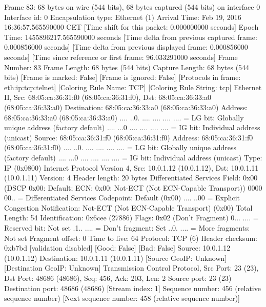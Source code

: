 Frame 83: 68 bytes on wire (544 bits), 68 bytes captured (544 bits) on interface 0
    Interface id: 0
    Encapsulation type: Ethernet (1)
    Arrival Time: Feb 19, 2016 16:36:57.565590000 CET
    [Time shift for this packet: 0.000000000 seconds]
    Epoch Time: 1455896217.565590000 seconds
    [Time delta from previous captured frame: 0.000856000 seconds]
    [Time delta from previous displayed frame: 0.000856000 seconds]
    [Time since reference or first frame: 96.033291000 seconds]
    Frame Number: 83
    Frame Length: 68 bytes (544 bits)
    Capture Length: 68 bytes (544 bits)
    [Frame is marked: False]
    [Frame is ignored: False]
    [Protocols in frame: eth:ip:tcp:telnet]
    [Coloring Rule Name: TCP]
    [Coloring Rule String: tcp]
Ethernet II, Src: 68:05:ca:36:31:f0 (68:05:ca:36:31:f0), Dst: 68:05:ca:36:33:a0 (68:05:ca:36:33:a0)
    Destination: 68:05:ca:36:33:a0 (68:05:ca:36:33:a0)
        Address: 68:05:ca:36:33:a0 (68:05:ca:36:33:a0)
        .... ..0. .... .... .... .... = LG bit: Globally unique address (factory default)
        .... ...0 .... .... .... .... = IG bit: Individual address (unicast)
    Source: 68:05:ca:36:31:f0 (68:05:ca:36:31:f0)
        Address: 68:05:ca:36:31:f0 (68:05:ca:36:31:f0)
        .... ..0. .... .... .... .... = LG bit: Globally unique address (factory default)
        .... ...0 .... .... .... .... = IG bit: Individual address (unicast)
    Type: IP (0x0800)
Internet Protocol Version 4, Src: 10.0.1.12 (10.0.1.12), Dst: 10.0.1.11 (10.0.1.11)
    Version: 4
    Header length: 20 bytes
    Differentiated Services Field: 0x00 (DSCP 0x00: Default; ECN: 0x00: Not-ECT (Not ECN-Capable Transport))
        0000 00.. = Differentiated Services Codepoint: Default (0x00)
        .... ..00 = Explicit Congestion Notification: Not-ECT (Not ECN-Capable Transport) (0x00)
    Total Length: 54
    Identification: 0x6cee (27886)
    Flags: 0x02 (Don't Fragment)
        0... .... = Reserved bit: Not set
        .1.. .... = Don't fragment: Set
        ..0. .... = More fragments: Not set
    Fragment offset: 0
    Time to live: 64
    Protocol: TCP (6)
    Header checksum: 0xb7bd [validation disabled]
        [Good: False]
        [Bad: False]
    Source: 10.0.1.12 (10.0.1.12)
    Destination: 10.0.1.11 (10.0.1.11)
    [Source GeoIP: Unknown]
    [Destination GeoIP: Unknown]
Transmission Control Protocol, Src Port: 23 (23), Dst Port: 48686 (48686), Seq: 456, Ack: 203, Len: 2
    Source port: 23 (23)
    Destination port: 48686 (48686)
    [Stream index: 1]
    Sequence number: 456    (relative sequence number)
    [Next sequence number: 458    (relative sequence number)]
